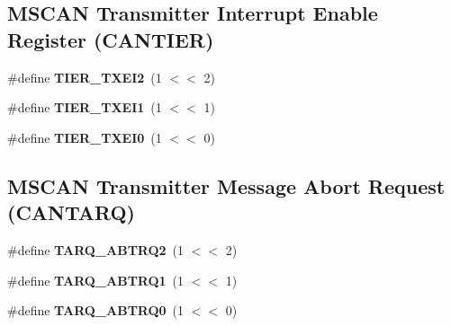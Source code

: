 \subsection*{M\+S\+C\+AN Transmitter Interrupt Enable Register (C\+A\+N\+T\+I\+ER)}
\begin{DoxyCompactItemize}
\item 
\mbox{\label{group__RTEMSBSPsPowerPCGen5200MSCAN_ga1d5ad658b4dfb9319e9299086fab0bf7}} 
\#define {\bfseries T\+I\+E\+R\+\_\+\+T\+X\+E\+I2}~(1 $<$$<$ 2)
\item 
\mbox{\label{group__RTEMSBSPsPowerPCGen5200MSCAN_ga0d27967571f6a508da057a485a7505f4}} 
\#define {\bfseries T\+I\+E\+R\+\_\+\+T\+X\+E\+I1}~(1 $<$$<$ 1)
\item 
\mbox{\label{group__RTEMSBSPsPowerPCGen5200MSCAN_ga09cc63c76c8ba74075948dac09e90f0c}} 
\#define {\bfseries T\+I\+E\+R\+\_\+\+T\+X\+E\+I0}~(1 $<$$<$ 0)
\end{DoxyCompactItemize}
\subsection*{M\+S\+C\+AN Transmitter Message Abort Request (C\+A\+N\+T\+A\+RQ)}
\begin{DoxyCompactItemize}
\item 
\mbox{\label{group__RTEMSBSPsPowerPCGen5200MSCAN_gade87521aa917e667fb0554959c95f790}} 
\#define {\bfseries T\+A\+R\+Q\+\_\+\+A\+B\+T\+R\+Q2}~(1 $<$$<$ 2)
\item 
\mbox{\label{group__RTEMSBSPsPowerPCGen5200MSCAN_ga2625175d0734f6beea015b32d2187e3d}} 
\#define {\bfseries T\+A\+R\+Q\+\_\+\+A\+B\+T\+R\+Q1}~(1 $<$$<$ 1)
\item 
\mbox{\label{group__RTEMSBSPsPowerPCGen5200MSCAN_gae098c4791b927f2c8d37727fcfd20b92}} 
\#define {\bfseries T\+A\+R\+Q\+\_\+\+A\+B\+T\+R\+Q0}~(1 $<$$<$ 0)
\end{DoxyCompactItemize}
